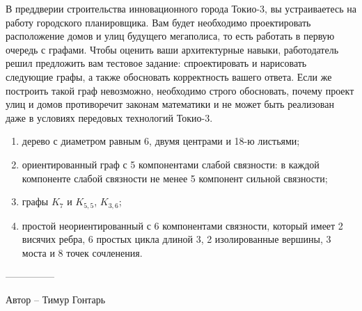 \question
В преддверии строительства инновационного города Токио-3, вы устраиваетесь на работу городского планировщика. Вам будет необходимо проектировать расположение домов и улиц будущего мегаполиса, то есть работать в первую очередь с графами. Чтобы оценить ваши архитектурные навыки, работодатель решил предложить вам тестовое задание: спроектировать и нарисовать следующие графы, а также обосновать корректность вашего ответа. Если же построить такой граф невозможно, необходимо строго обосновать, почему проект улиц и домов противоречит законам математики и не может быть реализован даже в условиях передовых технологий Токио-3.

\begin{enumerate}
\item  дерево с диаметром равным 6, двумя центрами и 18-ю листьями;
\item  ориентированный граф с 5 компонентами слабой связности: в  каждой компоненте слабой связности не менее 5 компонент сильной связности;
\item  графы $K_7$ и $K_{5,5}$, $K_{3,6}$;
\item  простой неориентированный с 6 компонентами связности, который имеет 2 висячих ребра, 6 простых цикла длиной 3, 2 изолированные вершины, 3 моста и 8 точек сочленения.
\end{enumerate}

---------------

Автор -- Тимур Гонтарь
